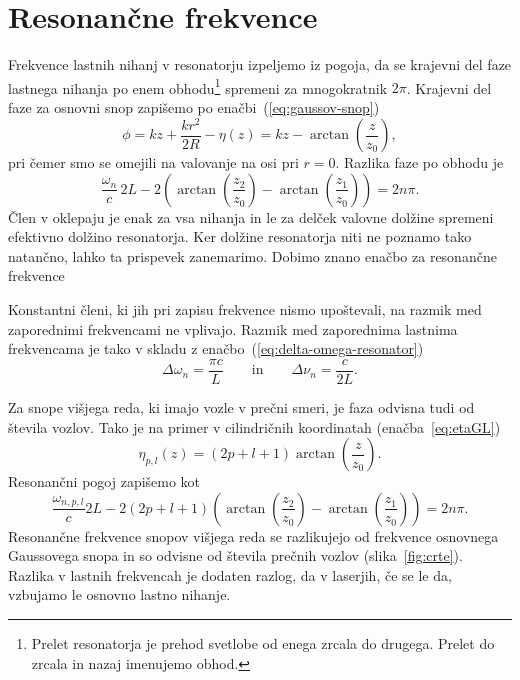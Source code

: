 \section{Resonančne frekvence}
Frekvence
lastnih nihanj v resonatorju izpeljemo iz pogoja, 
da se krajevni del faze lastnega nihanja po enem 
obhodu\footnote{Prelet resonatorja je prehod svetlobe od enega zrcala
do drugega. Prelet do zrcala in nazaj imenujemo obhod.}
spremeni za mnogokratnik $2\pi$. Krajevni del faze za osnovni snop 
zapišemo po enačbi~(\ref{eq:gaussov-snop})
\begin{equation}
\phi = kz+\frac{kr^{2}}{2R} -\eta(z) = kz-\arctan \left(\frac{z}{z_{0}}\right),
\label{eq:fazag}
\end{equation}
pri čemer  smo se omejili na valovanje na osi pri $r=0$. 
Razlika faze po obhodu je 
\begin{equation}
\frac{\omega_{n}}{c}\,2L-2\left(\arctan \left(\frac{z_{2}}{z_{0}}\right)-
\arctan\left(\frac{z_{1}}{z_{0}}\right)\right)=2n\pi.
\label{eq:fazan}
\end{equation}
Člen v oklepaju je enak za vsa nihanja in le za delček valovne dolžine 
spremeni efektivno dolžino resonatorja. Ker dolžine resonatorja niti ne poznamo
tako natančno, lahko ta prispevek zanemarimo. Dobimo znano enačbo za resonančne frekvence 

Konstantni členi, ki jih pri zapisu frekvence nismo upoštevali, na razmik med
zaporednimi frekvencami ne vplivajo. Razmik med zaporednima
lastnima frekvencama je tako v skladu z enačbo~(\ref{eq:delta-omega-resonator})
\begin{equation}
\Delta\omega_n=\frac{\pi c}{L} \qquad \mathrm{in}\qquad \Delta \nu_n=\frac{c}{2L}.
\label{eq:deltaomega}
\end{equation}

Za snope višjega reda, ki imajo vozle v prečni smeri, je faza
odvisna tudi od števila vozlov. Tako je na primer v cilindričnih koordinatah
(enačba~\ref{eq:etaGL})
\begin{equation}
\eta_{p,l}(z)=(2p+l+1)\arctan\left(\frac{z}{z_{0}}\right).
\end{equation}
Resonančni pogoj zapišemo kot
\begin{equation}
\frac{\omega_{n,p,l}}{c}2L-2(2p+l+1)\left(\arctan\left(\frac{z_{2}}{z_{0}}\right)-
\arctan\left(\frac{z_{1}}{z_{0}}\right)\right)=2n\pi.
\end{equation}
Resonančne frekvence snopov višjega reda se razlikujejo od frekvence osnovnega 
Gaussovega snopa in so odvisne od števila prečnih vozlov (slika~\ref{fig:crte}).
Razlika v lastnih frekvencah je dodaten razlog, da v laserjih, če se le da, 
vzbujamo le osnovno lastno nihanje.

